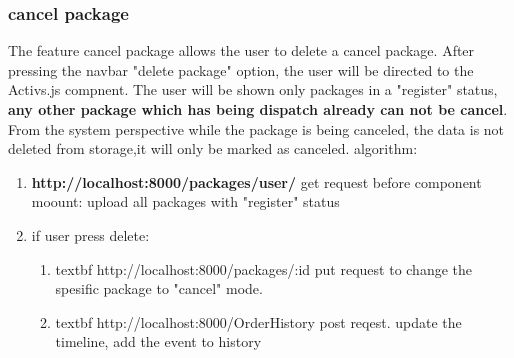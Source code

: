 \subsubsection{cancel package}
The feature cancel package allows the user to delete a cancel package.
After pressing the navbar "delete package" option, the user will be directed to the Activs.js compnent.\newline
The user will be shown only packages in a "register" status, \textbf{any other package which has being dispatch already can not be cancel}.\newline
From the system perspective while the package is being canceled, the data is not deleted from storage,it will only be marked as canceled. algorithm:
\begin{enumerate}
  \item \textbf{http://localhost:8000/packages/user/}  get request before component moount: upload all packages with "register" status
  \item if user press delete:
  \begin{enumerate}
      \item textbf {http://localhost:8000/packages/:id}  put request to change the spesific package to "cancel" mode.
      \item textbf {http://localhost:8000/OrderHistory}  post reqest. update the timeline, add the event to history
\end{enumerate}
\end{enumerate}